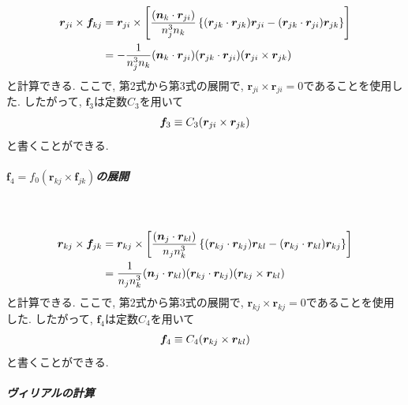 \begin{align}
    \bm{r}_{ji} \times \bm{f}_{kj}
 &=
    \bm{r}_{ji} \times
    \left[
          \frac{(\bm{n}_{k} \cdot \bm{r}_{ji})}{n_{j}^{3}n_{k}}
          \left\{
                  (\bm{r}_{jk} \cdot \bm{r}_{jk}) \bm{r}_{ji}
                 -(\bm{r}_{jk} \cdot \bm{r}_{ji}) \bm{r}_{jk}
          \right\}
    \right]
 \notag
 \\
 &=
    - \frac{1}{n_{j}^{3}n_{k}}
    (\bm{n}_{k} \cdot \bm{r}_{ji})
    (\bm{r}_{jk} \cdot \bm{r}_{ji})
    (\bm{r}_{ji} \times \bm{r}_{jk})
 \notag
\end{align}
と計算できる. ここで, 第2式から第3式の展開で, $\bm{r}_{ji} \times \bm{r}_{ji} = 0$であることを使用した. 
したがって, $\bm{f}_{3}$は定数$C_{3}$を用いて
\begin{align}
 \bm{f}_{3} \equiv C_{3} (\bm{r}_{ji} \times \bm{r}_{jk})
 \notag
\end{align}
と書くことができる. 
\\

\subparagraph{$\bm{f}_{4} = f_{0} (\bm{r}_{kj} \times \bm{f}_{jk})$の展開} \

\begin{align}
    \bm{r}_{kj} \times \bm{f}_{jk}
 &=
    \bm{r}_{kj} \times
    \left[
          \frac{(\bm{n}_{j} \cdot \bm{r}_{kl})}{n_{j}n_{k}^{3}}
          \left\{
                  (\bm{r}_{kj} \cdot \bm{r}_{kj}) \bm{r}_{kl}
                 -(\bm{r}_{kj} \cdot \bm{r}_{kl}) \bm{r}_{kj}
          \right\}
    \right]
 \notag
 \\
 &=
    \frac{1}{n_{j}n_{k}^{3}}
    (\bm{n}_{j} \cdot \bm{r}_{kl})
    (\bm{r}_{kj} \cdot \bm{r}_{kj})
    (\bm{r}_{kj} \times \bm{r}_{kl})
 \notag
\end{align}
と計算できる. ここで, 第2式から第3式の展開で, $\bm{r}_{kj} \times \bm{r}_{kj} = 0$であることを使用した. 
したがって, $\bm{f}_{4}$は定数$C_{4}$を用いて
\begin{align}
 \bm{f}_{4} \equiv C_{4} (\bm{r}_{kj} \times \bm{r}_{kl})
 \notag
\end{align}
と書くことができる. 
\\

\subparagraph{ヴィリアルの計算} \

